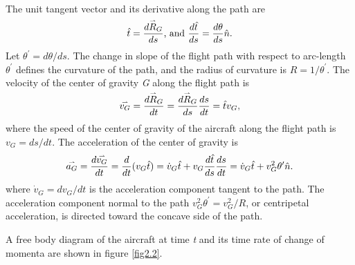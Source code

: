 \documentclass{AeroStructure-ERJohnson}
\def\harp#1{\smash{\mathord{\buildrel{\lower3pt\hbox{$\scriptscriptstyle\rightharpoonup$}}\over{#1}}}}
\begin{document}
{\def\thefigure{2.1}
}



The unit tangent vector and its derivative along the path are
\begin{align}\label{eq2.1}
\hat{t}=\frac{d \harp{R}_{G}}{d s}\mbox{, and }\frac{d \hat{t}}{d s}=\frac{d \theta}{d s} \hat{n}.
\end{align}
Let $\theta^{\prime}=d \theta/d s$. The change in slope of the flight path with respect to arc-length $\theta^{\prime}$ defines the curvature of the path, and the radius of curvature is $R=1/\theta^{\prime}$. The velocity of the center of gravity \textit{G} along the flight path is
\begin{align}\label{eq2.2}
\harp{v_{G}}=\frac{d \harp{R}_{G}}{d t}=\frac{d \harp{R}_{G}}{d s} \frac{d s}{d t}=\hat{t} v_{G},
\end{align}
where the speed of the center of gravity of the aircraft along the flight path is $v_{G}=d s/d t$. The acceleration of the center of gravity is
\begin{align}\label{eq2.3}
\harp{a_{G}}=\frac{d \harp{v_{G}}}{d t}=\frac{d}{d t}(v_{G} \hat{t})=\dot{v}_{G} \hat{t}+v_{G} \frac{d \hat{t}}{d s} \frac{d s}{d t}=\dot{v}_{G} \hat{t}+v_{G}^{2} \theta^{\prime} \hat{n}.
\end{align}
where $\dot{v}_{G}=d v_{G}/d t$ is the acceleration component tangent to the path. The acceleration component normal to the path $v_{G}^{2} \theta^{\prime}=v_{G}^{2}/R$, or centripetal acceleration, is directed toward the concave side of the path.

A free body diagram of the aircraft at time \textit{t} and its time rate of change of momenta are shown in figure \ref{fig2.2}.

{\def\thefigure{2.2}
}
\end{document}
